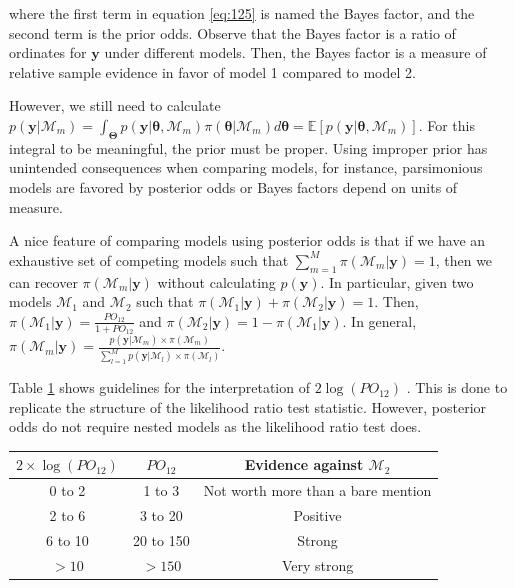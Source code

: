 where the first term in equation \ref{eq:125} is named the Bayes factor, and the second term is the prior odds. Observe that the Bayes factor is a ratio of ordinates for $\mathbf{y}$ under different models. Then, the Bayes factor is a measure of relative sample evidence in favor of model 1 compared to model 2. 

However, we still need to calculate $p(\mathbf{y}|\mathcal{M}_m)=\int_{\mathbf{\Theta}}p(\mathbf{y}|\mathbf{\theta},\mathcal{M}_m)\pi(\mathbf{\theta}|\mathcal{M}_m)d\mathbf{\theta}=\mathbb{E}\left[p(\mathbf{y}|\mathbf{\theta},\mathcal{M}_m)\right]$. For this integral to be meaningful, the prior must be proper. Using improper prior has unintended consequences when comparing models, for instance, parsimonious models are favored by posterior odds or Bayes factors depend on units of measure. 

A nice feature of comparing models using posterior odds is that if we have an exhaustive set of competing models such that $\sum_{m=1}^M \pi(\mathcal{M}_m|\mathbf{y})=1$, then we can recover $\pi(\mathcal{M}_m|\mathbf{y})$ without calculating $p(\mathbf{y})$. In particular, given two models $\mathcal{M}_1$ and $\mathcal{M}_2$ such that $\pi(\mathcal{M}_1|\mathbf{y})+\pi(\mathcal{M}_2|\mathbf{y})=1$. Then, $\pi(\mathcal{M}_1|\mathbf{y})=\frac{PO_{12}}{1+PO_{12}}$ and $\pi(\mathcal{M}_2|\mathbf{y})=1-\pi(\mathcal{M}_1|\mathbf{y})$. In general, $\pi(\mathcal{M}_m|\mathbf{y})=\frac{p(\mathbf{y}|\mathcal{M}_m)\times \pi(\mathcal{M}_m)}{\sum_{l=1}^M p(\mathbf{y}|\mathcal{M}_l)\times \pi(\mathcal{M}_l)}$.

Table \ref{tab:guide} shows guidelines for the interpretation of $2\log(PO_{12})$ \cite{Kass1995}. This is done to replicate the structure of the likelihood ratio test statistic. However, posterior odds do not require nested models as the likelihood ratio test does.

\begin{table}%
	\label{tab:guide}%
	\begin{tabular}{ccc}
		\textbf{$2\times\log(PO_{12})$}    & \textbf{$PO_{12}$} & \textbf{Evidence against $\mathcal{M}_2$} \\
		\hline
		0 to 2 & 1 to 3 & Not worth more than a bare mention\\
		2 to 6 & 3 to 20 & Positive\\
		6 to 10 & 20 to 150 & Strong\\
		$> 10$  & $> 150$ & Very strong\\
	\end{tabular}
\end{table}

